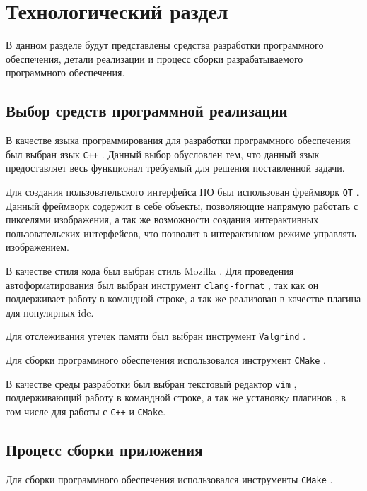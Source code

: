 \chapter{Технологический раздел}

    В данном разделе будут представлены средства разработки программного обеспечения, детали реализации и процесс сборки разрабатываемого программного обеспечения.
    
    \section{Выбор средств программной реализации}

        В качестве языка программирования для разработки программного обеспечения был выбран язык \texttt{C++} \cite{cpp}. Данный выбор обусловлен тем, что данный язык предоставляет весь функционал требуемый для решения поставленной задачи.

        Для создания пользовательского интерфейса ПО был использован фреймворк \texttt{QT} \cite{qt}. Данный фреймворк содержит в себе объекты, позволяющие напрямую работать с пикселями изображения, а  так же возможности создания интерактивных пользовательских интерфейсов, что позволит в интерактивном режиме управлять изображением.

        В качестве стиля кода был выбран стиль Mozilla \cite{fmtmozilla}. Для проведения автоформатирования был выбран инструмент \texttt{clang-format} \cite{clangfmt}, так как он поддерживает работу в командной строке, а так же реализован в качестве плагина для популярных ide.
        
        Для отслеживания утечек памяти был выбран инструмент \texttt{Valgrind} \cite{valgrind}.
        
        Для сборки программного обеспечения использовался инструмент \texttt{CMake} \cite{cmake}.
        
        В качестве среды разработки был выбран текстовый редактор \texttt{vim} \cite{vim}, поддерживающий работу в командной строке, а так же установкy плагинов \cite{vimawesome}, в том числе для работы с \texttt{C++} и \texttt{CMake}.

    \section{Процесс сборки приложения}

        Для сборки программного обеспечения использовался инструменты \texttt{CMake} \cite{cmake}.

